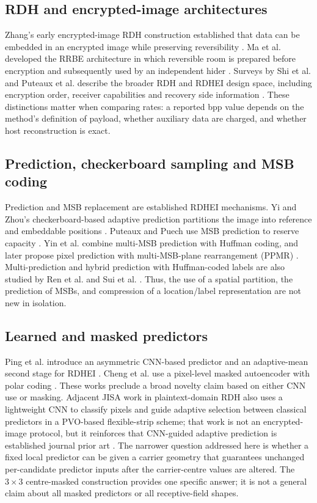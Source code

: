 \documentclass[preprint,12pt,a4paper]{elsarticle}
\begin{document}
\subsection{RDH and encrypted-image architectures}

Zhang's early encrypted-image RDH construction established that data can be embedded in an encrypted image while preserving reversibility \cite{zhang2011}. Ma et al. developed the RRBE architecture in which reversible room is prepared before encryption and subsequently used by an independent hider \cite{ma2013}. Surveys by Shi et al. and Puteaux et al. describe the broader RDH and RDHEI design space, including encryption order, receiver capabilities and recovery side information \cite{shi2016,puteaux2021survey}. These distinctions matter when comparing rates: a reported bpp value depends on the method's definition of payload, whether auxiliary data are charged, and whether host reconstruction is exact.

\subsection{Prediction, checkerboard sampling and MSB coding}

Prediction and MSB replacement are established RDHEI mechanisms. Yi and Zhou's checkerboard-based adaptive prediction partitions the image into reference and embeddable positions \cite{yi2018}. Puteaux and Puech use MSB prediction to reserve capacity \cite{puteaux2018}. Yin et al. combine multi-MSB prediction with Huffman coding, and later propose pixel prediction with multi-MSB-plane rearrangement (PPMR) \cite{yin2020,yin2021}. Multi-prediction and hybrid prediction with Huffman-coded labels are also studied by Ren et al. and Sui et al. \cite{ren2023,sui2023}. Thus, the use of a spatial partition, the prediction of MSBs, and compression of a location/label representation are not new in isolation.

\subsection{Learned and masked predictors}

Ping et al. introduce an asymmetric CNN-based predictor and an adaptive-mean second stage for RDHEI \cite{ping2024}. Cheng et al. use a pixel-level masked autoencoder with polar coding \cite{cheng2025masked}. These works preclude a broad novelty claim based on either CNN use or masking. Adjacent JISA work in plaintext-domain RDH also uses a lightweight CNN to classify pixels and guide adaptive selection between classical predictors in a PVO-based flexible-strip scheme; that work is not an encrypted-image protocol, but it reinforces that CNN-guided adaptive prediction is established journal prior art \cite{fan2026cnn}. The narrower question addressed here is whether a fixed local predictor can be given a carrier geometry that guarantees unchanged per-candidate predictor inputs after the carrier-centre values are altered. The $3\times3$ centre-masked construction provides one specific answer; it is not a general claim about all masked predictors or all receptive-field shapes.
\end{document}
